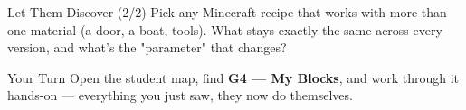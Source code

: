 \documentclass[aspectratio=169]{beamer}
\begin{document}
\begin{frame}{Let Them Discover (2/2)}
    \Large
    Pick any Minecraft recipe that works with more than one material (a door, a boat, tools). What stays exactly the same across every version, and what's the "parameter" that changes?
\end{frame}

\begin{frame}{Your Turn}
    \Large
    Open the student map, find \textbf{G4 — My Blocks}, and work through it
    hands-on --- everything you just saw, they now do themselves.
\end{frame}
\end{document}
